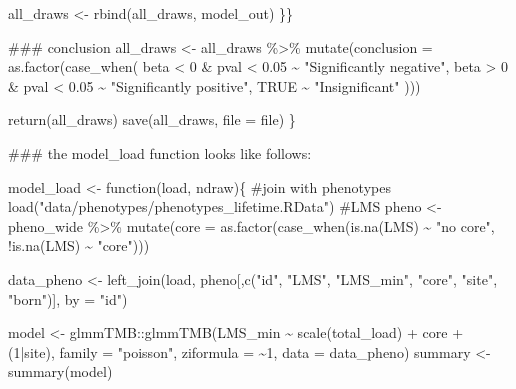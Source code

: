 \documentclass[
  letterpaper,
  DIV=11,
  numbers=noendperiod]{scrreprt}
\newenvironment{Shaded}{}{}
\newcommand{\AttributeTok}[1]{\textcolor[rgb]{0.84,0.23,0.29}{#1}}
\newcommand{\CommentTok}[1]{\textcolor[rgb]{0.42,0.45,0.49}{#1}}
\newcommand{\ConstantTok}[1]{\textcolor[rgb]{0.00,0.36,0.77}{#1}}
\newcommand{\ControlFlowTok}[1]{\textcolor[rgb]{0.84,0.23,0.29}{#1}}
\newcommand{\DecValTok}[1]{\textcolor[rgb]{0.00,0.36,0.77}{#1}}
\newcommand{\DocumentationTok}[1]{\textcolor[rgb]{0.42,0.45,0.49}{#1}}
\newcommand{\FloatTok}[1]{\textcolor[rgb]{0.00,0.36,0.77}{#1}}
\newcommand{\FunctionTok}[1]{\textcolor[rgb]{0.44,0.26,0.76}{#1}}
\newcommand{\NormalTok}[1]{\textcolor[rgb]{0.14,0.16,0.18}{#1}}
\newcommand{\OtherTok}[1]{\textcolor[rgb]{0.44,0.26,0.76}{#1}}
\newcommand{\SpecialCharTok}[1]{\textcolor[rgb]{0.00,0.36,0.77}{#1}}
\newcommand{\StringTok}[1]{\textcolor[rgb]{0.01,0.18,0.38}{#1}}
\begin{document}
\begin{Shaded}
\begin{Highlighting}[]
\NormalTok{      all\_draws }\OtherTok{\textless{}{-}} \FunctionTok{rbind}\NormalTok{(all\_draws, model\_out)}
\NormalTok{    \}\}}
  
  \DocumentationTok{\#\#\# conclusion}
\NormalTok{  all\_draws }\OtherTok{\textless{}{-}}\NormalTok{ all\_draws }\SpecialCharTok{\%\textgreater{}\%} \FunctionTok{mutate}\NormalTok{(}\AttributeTok{conclusion =} \FunctionTok{as.factor}\NormalTok{(}\FunctionTok{case\_when}\NormalTok{(}
\NormalTok{    beta }\SpecialCharTok{\textless{}} \DecValTok{0} \SpecialCharTok{\&}\NormalTok{ pval }\SpecialCharTok{\textless{}} \FloatTok{0.05} \SpecialCharTok{\textasciitilde{}} \StringTok{"Significantly negative"}\NormalTok{,}
\NormalTok{    beta }\SpecialCharTok{\textgreater{}} \DecValTok{0} \SpecialCharTok{\&}\NormalTok{ pval }\SpecialCharTok{\textless{}} \FloatTok{0.05} \SpecialCharTok{\textasciitilde{}} \StringTok{"Significantly positive"}\NormalTok{,}
    \ConstantTok{TRUE} \SpecialCharTok{\textasciitilde{}} \StringTok{"Insignificant"}
\NormalTok{  )))}
  
  \FunctionTok{return}\NormalTok{(all\_draws)}
  \FunctionTok{save}\NormalTok{(all\_draws, }\AttributeTok{file =}\NormalTok{ file)}
\NormalTok{\}}

\DocumentationTok{\#\#\# the model\_load function looks like follows:}


\NormalTok{model\_load }\OtherTok{\textless{}{-}} \ControlFlowTok{function}\NormalTok{(load, ndraw)\{}
  \CommentTok{\#join with phenotypes}
  \FunctionTok{load}\NormalTok{(}\StringTok{"data/phenotypes/phenotypes\_lifetime.RData"}\NormalTok{) }\CommentTok{\#LMS}
\NormalTok{  pheno }\OtherTok{\textless{}{-}}\NormalTok{ pheno\_wide }\SpecialCharTok{\%\textgreater{}\%} \FunctionTok{mutate}\NormalTok{(}\AttributeTok{core =} \FunctionTok{as.factor}\NormalTok{(}\FunctionTok{case\_when}\NormalTok{(}\FunctionTok{is.na}\NormalTok{(LMS) }\SpecialCharTok{\textasciitilde{}} \StringTok{"no core"}\NormalTok{, }\SpecialCharTok{!}\FunctionTok{is.na}\NormalTok{(LMS) }\SpecialCharTok{\textasciitilde{}} \StringTok{"core"}\NormalTok{)))}
  
\NormalTok{  data\_pheno }\OtherTok{\textless{}{-}} \FunctionTok{left\_join}\NormalTok{(load, pheno[,}\FunctionTok{c}\NormalTok{(}\StringTok{"id"}\NormalTok{, }\StringTok{"LMS"}\NormalTok{, }\StringTok{"LMS\_min"}\NormalTok{, }\StringTok{"core"}\NormalTok{, }\StringTok{"site"}\NormalTok{, }\StringTok{"born"}\NormalTok{)], }\AttributeTok{by =} \StringTok{"id"}\NormalTok{)}
  
\NormalTok{  model }\OtherTok{\textless{}{-}}\NormalTok{ glmmTMB}\SpecialCharTok{::}\FunctionTok{glmmTMB}\NormalTok{(LMS\_min }\SpecialCharTok{\textasciitilde{}} \FunctionTok{scale}\NormalTok{(total\_load) }\SpecialCharTok{+}\NormalTok{ core }\SpecialCharTok{+}\NormalTok{ (}\DecValTok{1}\SpecialCharTok{|}\NormalTok{site), }\AttributeTok{family =} \StringTok{"poisson"}\NormalTok{, }\AttributeTok{ziformula =} \SpecialCharTok{\textasciitilde{}}\DecValTok{1}\NormalTok{, }\AttributeTok{data =}\NormalTok{ data\_pheno)}
\NormalTok{  summary }\OtherTok{\textless{}{-}} \FunctionTok{summary}\NormalTok{(model)}
  

\end{Highlighting}
\end{Shaded}
\end{document}
